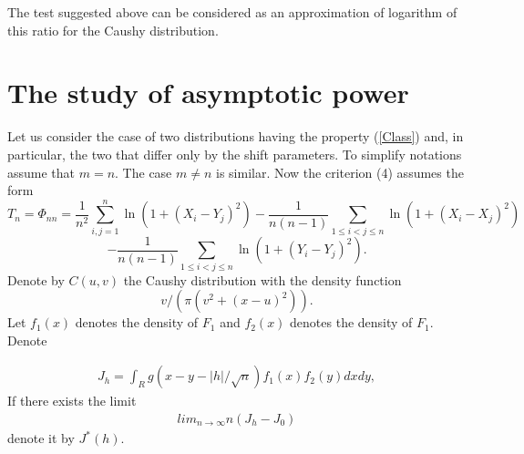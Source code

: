 \documentclass{svproc}
\begin{document}
The test suggested above can be considered as an approximation of logarithm of this ratio for the Caushy distribution.



\section{The study of asymptotic power}
\label{S:2}

Let us consider the case of two distributions having the property (\ref{Class}) and, in particular, the two that differ only by the shift parameters. To simplify notations assume that $m=n$. The case $m\ne n$ is similar.
Now the criterion  (4)  assumes the form
\begin{equation}
T_n=\Phi_{nn}= \frac{1}{n^2}\sum_{i,j=1}^n \ln(1 + (X_i - Y_j)^2)-\frac{1}{n(n-1)}\sum_{1\leq i<j\leq n}  \ln(1 + (X_i - X_j)^2)
\end{equation}
\begin{equation}
-  \frac{1}{n(n-1)}\sum_{1\leq i<j\leq n}  \ln(1 + (Y_i - Y_j)^2).
\end{equation}
Denote by $C(u,v)$ the Caushy distribution with the density function
$$
v/(\pi(v^2 + (x-u)^2)).
$$Let $f_1(x)$ denotes the density of $F_1$ and $f_2(x)$ denotes the density of $F_1$.
Denote

\begin{eqnarray*}
J_h =\int_R g(x-y-|h|/\sqrt{n})f_1(x)f_2(y)dxdy,
\end{eqnarray*}
If there exists the limit
\begin{eqnarray}
lim_{n\to \infty} n(J_h - J_0)
\end{eqnarray}
denote it by $J^*(h)$.
\end{document}
